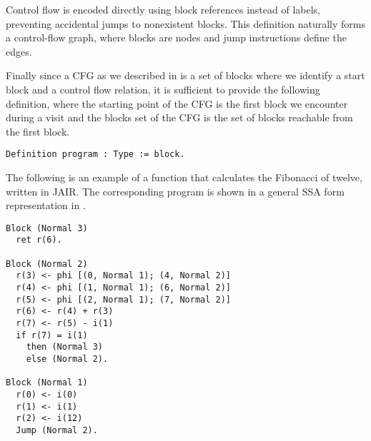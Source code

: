 Control flow is encoded directly using block references instead of labels, preventing accidental jumps to nonexistent blocks. This definition naturally forms a control-flow graph, where blocks are nodes and jump instructions define the edges.

Finally since a CFG as we described in  is a set of blocks where we identify a start block and a control flow relation, it is sufficient to provide the following definition, where the starting point of the CFG is the first block we encounter during a visit and the blocks set of the CFG is the set of blocks reachable from the first block.

\begin{lstlisting}[style=Coq]
Definition program : Type := block.
\end{lstlisting}

The following is an example of a function that calculates the Fibonacci of twelve, written in JAIR. The corresponding program is shown in a general SSA form representation in .

\begin{lstlisting}[style=Coq]
Block (Normal 3)
  ret r(6).

Block (Normal 2)
  r(3) <- phi [(0, Normal 1); (4, Normal 2)]
  r(4) <- phi [(1, Normal 1); (6, Normal 2)]
  r(5) <- phi [(2, Normal 1); (7, Normal 2)]
  r(6) <- r(4) + r(3)
  r(7) <- r(5) - i(1)
  if r(7) = i(1)
    then (Normal 3)
    else (Normal 2).

Block (Normal 1)
  r(0) <- i(0)
  r(1) <- i(1)
  r(2) <- i(12)
  Jump (Normal 2).
\end{lstlisting}




